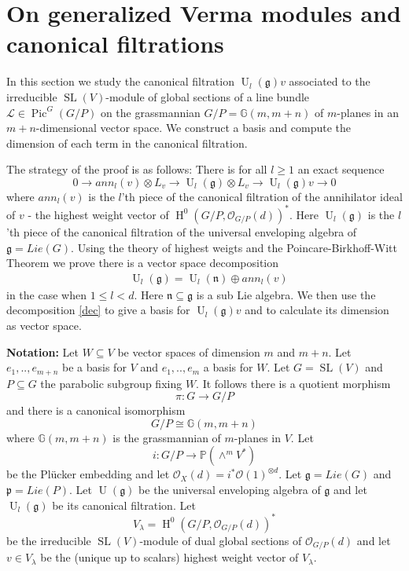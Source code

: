 \documentclass{amsart}
\theoremstyle{plain}
\theoremstyle{definition}
\theoremstyle{remark}
\numberwithin{equation}{theorem}
\begin{document}
\section{On generalized Verma modules and canonical filtrations}

In this section we study the canonical filtration ${\operatorname{U}}_l({\mathfrak{g}})v$ associated to the
irreducible ${\operatorname{SL}}(V)$-module of global sections of a line bundle ${\mathcal{L}}\in
{\operatorname{Pic} }^G(G/P)$ on the grassmannian $G/P={\mathbb{G} }(m,m+n)$ of $m$-planes in an
$m+n$-dimensional vector space. We construct a basis and compute the
dimension of each term in the canonical filtration.

The strategy of the proof is as follows: There is for all $l\geq 1$ an exact sequence
\[ 0 \rightarrow ann_l(v)\otimes L_v \rightarrow {\operatorname{U}}_l({\mathfrak{g}})\otimes L_v
\rightarrow {\operatorname{U}}_l({\mathfrak{g}})v \rightarrow 0 \]
where $ann_l(v)$ is the $l$'th piece of the canonical filtration of
the annihilator ideal of $v$ - the highest weight vector of ${\operatorname{H} }^0(G/P,
{\mathcal{O} }_{G/P}(d))^*$. Here ${\operatorname{U}}_l({\mathfrak{g}})$ is the $l$'th piece of the canonical
filtration of the universal enveloping algebra of ${\mathfrak{g}}=Lie(G)$.
Using the theory of highest weigts and the Poincare-Birkhoff-Witt
Theorem we prove there is a vector space decomposition
\begin{align}
&\label{dec}  {\operatorname{U}}_l({\mathfrak{g}})={\operatorname{U}}_l({\mathfrak{n}})\oplus ann_l(v) 
\end{align}
in the case when $1\leq l <d$. Here ${\mathfrak{n}} \subseteq {\mathfrak{g}}$ is a sub Lie
algebra. We then use the decomposition \ref{dec} to give a basis for
${\operatorname{U}}_l({\mathfrak{g}})v$ and to calculate its dimension as vector space.

\textbf{Notation:} Let $W\subseteq V$ be vector spaces of dimension
$m$ and $m+n$. Let $e_1,..,e_{m+n}$ be a basis for $V$ and
$e_1,..,e_m$ a basis for $W$. Let $G={\operatorname{SL}}(V)$ and $P\subseteq G$ the
parabolic subgroup fixing $W$. It follows there is a quotient morphism
\[ \pi:G\rightarrow G/P \]
and there is a canonical isomorphism
\[ G/P\cong {\mathbb{G} }(m,m+n) \]
where ${\mathbb{G} }(m,m+n)$ is the grassmannian of $m$-planes in $V$.
Let 
\[ i:G/P\rightarrow {\mathbb{P}}(\wedge^m V^*) \]
be the Pl\"{u}cker embedding and let ${\mathcal{O} }_X(d)=i^*{\mathcal{O} }(1)^{\otimes d}$.
Let ${\mathfrak{g}}=Lie(G)$ and ${\mathfrak{p}}=Lie(P)$. Let ${\operatorname{U}}({\mathfrak{g}})$ be the universal
enveloping algebra of ${\mathfrak{g}}$ and let ${\operatorname{U}}_l({\mathfrak{g}})$ be its canonical
filtration. Let 
\[ {V_\lambda}={\operatorname{H} }^0(G/P,{\mathcal{O} }_{G/P}(d))^* \]
be the irreducible ${\operatorname{SL}}(V)$-module of dual global sections of
${\mathcal{O} }_{G/P}(d)$ and let $v\in {V_\lambda}$ be the (unique up to scalars) highest
weight vector of ${V_\lambda}$.
\end{document}
